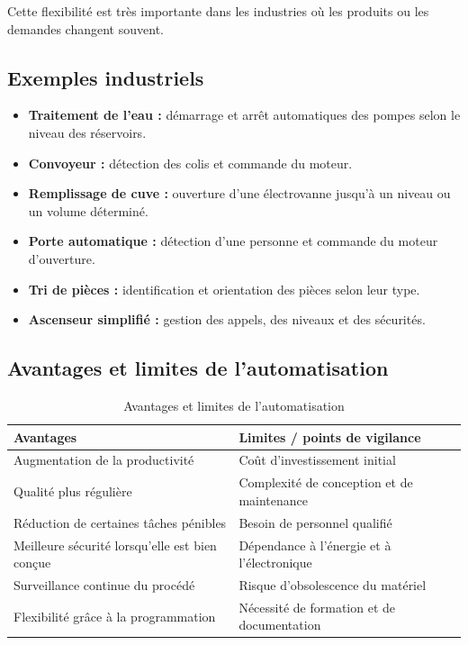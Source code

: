 Cette flexibilité est très importante dans les industries où les produits ou les demandes changent souvent.

\subsection{Exemples industriels}

\begin{itemize}
    \item \textbf{Traitement de l'eau :} démarrage et arrêt automatiques des pompes selon le niveau des réservoirs.
    \item \textbf{Convoyeur :} détection des colis et commande du moteur.
    \item \textbf{Remplissage de cuve :} ouverture d'une électrovanne jusqu'à un niveau ou un volume déterminé.
    \item \textbf{Porte automatique :} détection d'une personne et commande du moteur d'ouverture.
    \item \textbf{Tri de pièces :} identification et orientation des pièces selon leur type.
    \item \textbf{Ascenseur simplifié :} gestion des appels, des niveaux et des sécurités.
\end{itemize}

\subsection{Avantages et limites de l'automatisation}

\begin{table}[h]
\centering
\begin{tabularx}{\textwidth}{|X|X|}
\hline
\textbf{Avantages} & \textbf{Limites / points de vigilance} \\
\hline
Augmentation de la productivité & Coût d'investissement initial \\
\hline
Qualité plus régulière & Complexité de conception et de maintenance \\
\hline
Réduction de certaines tâches pénibles & Besoin de personnel qualifié \\
\hline
Meilleure sécurité lorsqu'elle est bien conçue & Dépendance à l'énergie et à l'électronique \\
\hline
Surveillance continue du procédé & Risque d'obsolescence du matériel \\
\hline
Flexibilité grâce à la programmation & Nécessité de formation et de documentation \\
\hline
\end{tabularx}
\caption{Avantages et limites de l'automatisation}
\end{table}

